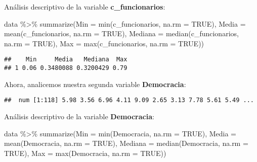 \documentclass[
]{article}
\newenvironment{Shaded}{\begin{snugshade}}{\end{snugshade}}
\newcommand{\AttributeTok}[1]{\textcolor[rgb]{0.77,0.63,0.00}{#1}}
\newcommand{\ConstantTok}[1]{\textcolor[rgb]{0.00,0.00,0.00}{#1}}
\newcommand{\FunctionTok}[1]{\textcolor[rgb]{0.00,0.00,0.00}{#1}}
\newcommand{\NormalTok}[1]{#1}
\newcommand{\SpecialCharTok}[1]{\textcolor[rgb]{0.00,0.00,0.00}{#1}}
\begin{document}
Análisis descriptivo de la variable \textbf{c\_funcionarios}:

\begin{Shaded}
\begin{Highlighting}[]
\NormalTok{data }\SpecialCharTok{\%\textgreater{}\%}
 \FunctionTok{summarize}\NormalTok{(}\AttributeTok{Min =} \FunctionTok{min}\NormalTok{(c\_funcionarios, }\AttributeTok{na.rm =} \ConstantTok{TRUE}\NormalTok{),}
           \AttributeTok{Media =} \FunctionTok{mean}\NormalTok{(c\_funcionarios, }\AttributeTok{na.rm =} \ConstantTok{TRUE}\NormalTok{),}
           \AttributeTok{Mediana =} \FunctionTok{median}\NormalTok{(c\_funcionarios, }\AttributeTok{na.rm =} \ConstantTok{TRUE}\NormalTok{),}
           \AttributeTok{Max =} \FunctionTok{max}\NormalTok{(c\_funcionarios, }\AttributeTok{na.rm =} \ConstantTok{TRUE}\NormalTok{))}
\end{Highlighting}
\end{Shaded}

\begin{verbatim}
##    Min     Media   Mediana  Max
## 1 0.06 0.3480088 0.3200429 0.79
\end{verbatim}

Ahora, analicemos nuestra segunda variable \textbf{Democracia}:

\begin{Shaded}
\end{Shaded}

\begin{verbatim}
##  num [1:118] 5.98 3.56 6.96 4.11 9.09 2.65 3.13 7.78 5.61 5.49 ...
\end{verbatim}

Análisis descriptivo de la variable \textbf{Democracia}:

\begin{Shaded}
\begin{Highlighting}[]
\NormalTok{data }\SpecialCharTok{\%\textgreater{}\%}
 \FunctionTok{summarize}\NormalTok{(}\AttributeTok{Min =} \FunctionTok{min}\NormalTok{(Democracia, }\AttributeTok{na.rm =} \ConstantTok{TRUE}\NormalTok{),}
           \AttributeTok{Media =} \FunctionTok{mean}\NormalTok{(Democracia, }\AttributeTok{na.rm =} \ConstantTok{TRUE}\NormalTok{),}
           \AttributeTok{Mediana =} \FunctionTok{median}\NormalTok{(Democracia, }\AttributeTok{na.rm =} \ConstantTok{TRUE}\NormalTok{),}
           \AttributeTok{Max =} \FunctionTok{max}\NormalTok{(Democracia, }\AttributeTok{na.rm =} \ConstantTok{TRUE}\NormalTok{))}
\end{Highlighting}
\end{Shaded}
\end{document}
